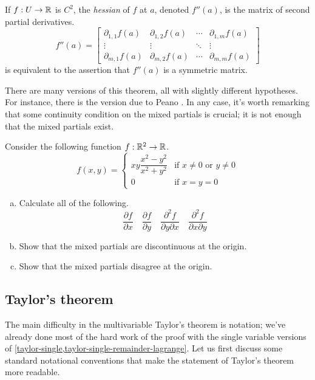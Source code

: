 \begin{remark}
	If $f : U \to \mathbb{R}$ is $C^2$, the \emph{hessian} of $f$ at $a$, denoted $f''(a)$, is the matrix of second partial derivatives. 
	\[ f''(a) = \begin{bmatrix} \partial_{1,1} f(a) & \partial_{1,2} f(a) & \dotsb & \partial_{1,m} f(a) \\
	\vdots & \vdots & \ddots & \vdots \\
	\partial_{m,1} f(a) & \partial_{m,2} f(a) & \dotsb & \partial_{m,m} f(a) \end{bmatrix} \]
	 is equivalent to the assertion that $f''(a)$ is a symmetric matrix. 
\end{remark}

There are many versions of this theorem, all with slightly different hypotheses. For instance, there is the version due to Peano \cite[theorem 9.41]{rudin}. In any case, it's worth remarking that some continuity condition on the mixed partials is crucial; it is not enough that the mixed partials exist.

\begin{exercise}
	Consider the following function $f : \mathbb{R}^2 \to \mathbb{R}$. 
	\[ f(x,y) = \begin{cases} xy \dfrac{x^2 - y^2}{x^2 + y^2} & \text{if } x \neq 0 \text{ or } y \neq 0 \\ 0 &  \text{if } x = y = 0 \end{cases} \]
	\begin{enumerate}[(a)]
		\item Calculate all of the following. 
		\[ \frac{\partial f}{\partial x} \quad \frac{\partial f}{\partial y} \quad \frac{\partial^2 f}{\partial y \partial x} \quad \frac{\partial^2 f}{\partial x \partial y} \]
		\item Show that the mixed partials are discontinuous at the origin. 
		\item Show that the mixed partials disagree at the origin. 
	\end{enumerate}
\end{exercise}

\subsection{Taylor's theorem \starred} 

The main difficulty in the multivariable Taylor's theorem is notation; we've already done most of the hard work of the proof with the single variable versions of \cref{taylor-single,taylor-single-remainder-lagrange}. Let us first discuss some standard notational conventions that make the statement of Taylor's theorem more readable. 

